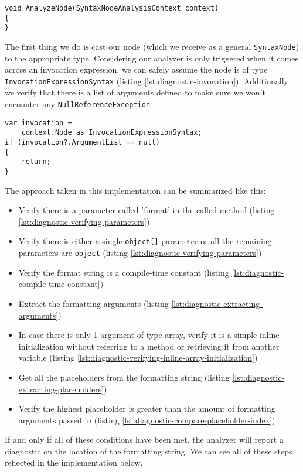 \begin{lstlisting}[label={lst:diagnostic-analyzenode}]
void AnalyzeNode(SyntaxNodeAnalysisContext context)
{
}
\end{lstlisting}

The first thing we do is cast our node (which we receive as a general \texttt{SyntaxNode}) to the appropriate type. Considering our analyzer is only triggered when it comes across an \gls{invocation} expression, we can safely assume the node is of type \\ \texttt{InvocationExpressionSyntax} (listing \ref{lst:diagnostic-invocation}). Additionally we verify that there is a list of arguments defined to make sure we won't encounter any \texttt{NullReferenceException}

\begin{lstlisting}[label={lst:diagnostic-invocation}]
var invocation = 
	context.Node as InvocationExpressionSyntax;
if (invocation?.ArgumentList == null)
{
	return;
}
\end{lstlisting}

\begin{minipage}{\linewidth}
The approach taken in this implementation can be summarized like this:

\begin{itemize}
\setlength\itemsep{1em}
\item Verify there is a parameter called 'format' in the called method (listing \ref{lst:diagnostic-verifying-parameters})
\item Verify there is either a single \texttt{object[]} parameter or all the remaining parameters are \texttt{object} (listing \ref{lst:diagnostic-verifying-parameters})
\item Verify the format string is a compile-time constant (listing \ref{lst:diagnostic-compile-time-constant})
\item Extract the formatting arguments (listing \ref{lst:diagnostic-extracting-arguments})
\item In case there is only 1 argument of type array, verify it is a simple inline initialization without referring to a method or retrieving it from another variable (listing \ref{lst:diagnostic-verifying-inline-array-initialization})
\item Get all the placeholders from the formatting string (listing \ref{lst:diagnostic-extracting-placeholders})
\item Verify the highest placeholder is greater than the amount of formatting arguments passed in (listing \ref{lst:diagnostic-compare-placeholder-index})
\end{itemize}

\noindent If and only if all of these conditions have been met, the analyzer will report a diagnostic on the location of the formatting string. We can see all of these steps reflected in the implementation below.
\end{minipage}



